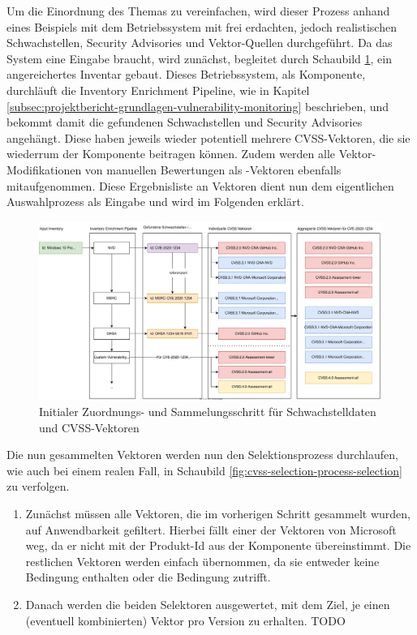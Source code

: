 Um die Einordnung des Themas zu vereinfachen, wird dieser Prozess anhand eines Beispiels mit dem Betriebssystem  mit frei erdachten, jedoch realistischen Schwachstellen, Security Advisories und Vektor-Quellen durchgeführt.
Da das System eine Eingabe braucht, wird zunächst, begleitet durch Schaubild \ref{fig:cvss-selection-process-collection}, ein angereichertes Inventar gebaut.
Dieses Betriebssystem, als Komponente, durchläuft die Inventory Enrichment Pipeline, wie in Kapitel \ref{subsec:projektbericht-grundlagen-vulnerability-monitoring} beschrieben, und bekommt damit die gefundenen Schwachstellen und Security Advisories angehängt.
Diese haben jeweils wieder potentiell mehrere CVSS-Vektoren, die sie wiederrum der Komponente beitragen können.
Zudem werden alle Vektor-Modifikationen von manuellen Bewertungen als -Vektoren ebenfalls mitaufgenommen.
Diese Ergebnisliste an Vektoren dient nun dem eigentlichen Auswahlprozess als Eingabe und wird im Folgenden erklärt.

\begin{figure}[htbp] %
    \centering
    \includegraphics[width=1\textwidth, keepaspectratio]{res/grafiken/cvss-selection-process-collection}
    \caption{Initialer Zuordnungs- und Sammelungsschritt für Schwachstelldaten und CVSS-Vektoren}
    \label{fig:cvss-selection-process-collection}
\end{figure}

Die nun gesammelten Vektoren werden nun den Selektionsprozess durchlaufen, wie auch bei einem realen Fall, in Schaubild \ref{fig:cvss-selection-process-selection} zu verfolgen.

\begin{enumerate}
    \item Zunächst müssen alle Vektoren, die im vorherigen Schritt gesammelt wurden, auf Anwendbarkeit gefiltert.
    Hierbei fällt einer der Vektoren von Microsoft weg, da er nicht mit der Produkt-Id aus der Komponente übereinstimmt.
    Die restlichen Vektoren werden einfach übernommen, da sie entweder keine Bedingung enthalten oder die Bedingung zutrifft.
    \item Danach werden die beiden Selektoren ausgewertet, mit dem Ziel, je einen (eventuell kombinierten) Vektor pro Version zu erhalten.
    TODO
\end{enumerate}

